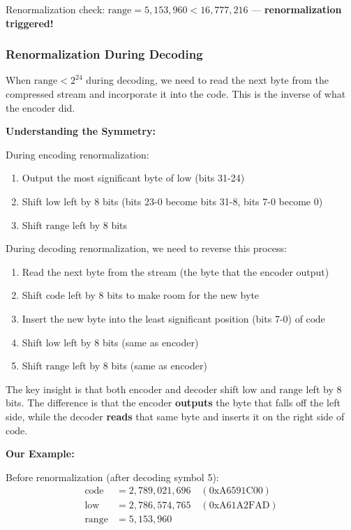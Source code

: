 \documentclass[12pt]{article}
\begin{document}
Renormalization check: $\text{range} = 5{,}153{,}960 < 16{,}777{,}216$ — \textbf{renormalization triggered!}

\subsubsection*{Renormalization During Decoding}

When $\text{range} < 2^{24}$ during decoding, we need to read the next byte from the compressed stream and incorporate it into the code. This is the inverse of what the encoder did.

\textbf{Understanding the Symmetry:}

During encoding renormalization:
\begin{enumerate}
    \item Output the most significant byte of $\text{low}$ (bits 31-24)
    \item Shift $\text{low}$ left by 8 bits (bits 23-0 become bits 31-8, bits 7-0 become 0)
    \item Shift $\text{range}$ left by 8 bits
\end{enumerate}

During decoding renormalization, we need to reverse this process:
\begin{enumerate}
    \item Read the next byte from the stream (the byte that the encoder output)
    \item Shift $\text{code}$ left by 8 bits to make room for the new byte
    \item Insert the new byte into the least significant position (bits 7-0) of $\text{code}$
    \item Shift $\text{low}$ left by 8 bits (same as encoder)
    \item Shift $\text{range}$ left by 8 bits (same as encoder)
\end{enumerate}

The key insight is that both encoder and decoder shift $\text{low}$ and $\text{range}$ left by 8 bits. The difference is that the encoder \textbf{outputs} the byte that falls off the left side, while the decoder \textbf{reads} that same byte and inserts it on the right side of $\text{code}$.

\vspace{2mm}
\textbf{Our Example:}

Before renormalization (after decoding symbol 5):
\begin{align*}
\text{code} &= 2{,}789{,}021{,}696 \quad (\text{0xA6591C00}) \\
\text{low} &= 2{,}786{,}574{,}765 \quad (\text{0xA61A2FAD}) \\
\text{range} &= 5{,}153{,}960
\end{align*}
\end{document}
